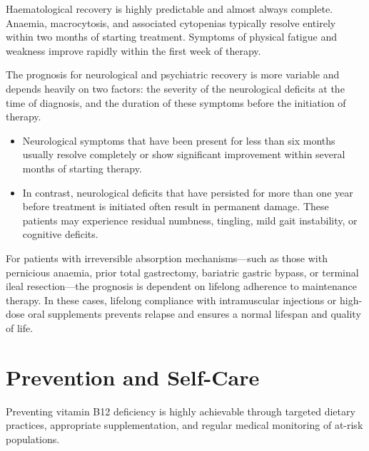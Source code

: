 Haematological recovery is highly predictable and almost always complete. Anaemia, macrocytosis, and associated cytopenias typically resolve entirely within two months of starting treatment. Symptoms of physical fatigue and weakness improve rapidly within the first week of therapy.

The prognosis for neurological and psychiatric recovery is more variable and depends heavily on two factors: the severity of the neurological deficits at the time of diagnosis, and the duration of these symptoms before the initiation of therapy.
\begin{itemize}
    \item Neurological symptoms that have been present for less than six months usually resolve completely or show significant improvement within several months of starting therapy.
    \item In contrast, neurological deficits that have persisted for more than one year before treatment is initiated often result in permanent damage. These patients may experience residual numbness, tingling, mild gait instability, or cognitive deficits.
\end{itemize}

For patients with irreversible absorption mechanisms—such as those with pernicious anaemia, prior total gastrectomy, bariatric gastric bypass, or terminal ileal resection—the prognosis is dependent on lifelong adherence to maintenance therapy. In these cases, lifelong compliance with intramuscular injections or high-dose oral supplements prevents relapse and ensures a normal lifespan and quality of life.

\section*{Prevention and Self-Care}
Preventing vitamin B12 deficiency is highly achievable through targeted dietary practices, appropriate supplementation, and regular medical monitoring of at-risk populations.

